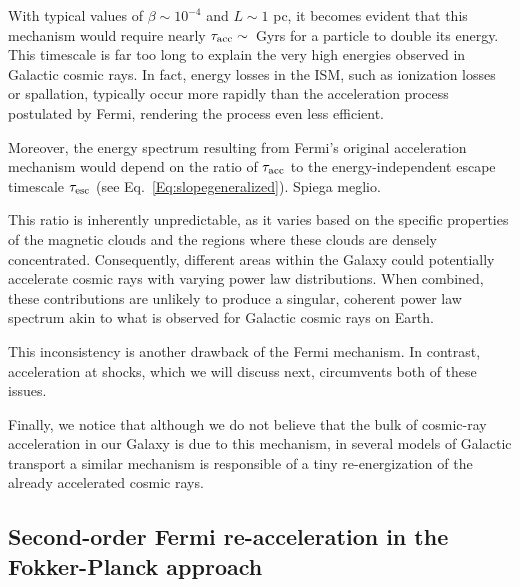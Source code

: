 With typical values of \( \beta \sim 10^{-4} \) and \( L \sim 1 \) pc, it becomes evident that this mechanism would require nearly $\tau_{\rm acc} \sim $~Gyrs for a particle to double its energy. 
%
This timescale is far too long to explain the very high energies observed in Galactic cosmic rays.
In fact, energy losses in the ISM, such as ionization losses or spallation, typically occur more rapidly than the acceleration process postulated by Fermi, rendering the process even less efficient.

Moreover, the energy spectrum resulting from Fermi's original acceleration mechanism would depend on the ratio of $\tau_{\rm acc}$ to the energy-independent escape timescale $\tau_{\rm esc}$ (see Eq.~\ref{Eq:slopegeneralized}). {\color{red}Spiega meglio.}

This ratio is inherently unpredictable, as it varies based on the specific properties of the magnetic clouds and the regions where these clouds are densely concentrated. Consequently, different areas within the Galaxy could potentially accelerate cosmic rays with varying power law distributions. When combined, these contributions are unlikely to produce a singular, coherent power law spectrum akin to what is observed for Galactic cosmic rays on Earth.

This inconsistency is another drawback of the Fermi mechanism. In contrast, acceleration at shocks, which we will discuss next, circumvents both of these issues. 

Finally, we notice that although we do not believe that the bulk of cosmic-ray acceleration in our Galaxy is due to this mechanism, in several models of Galactic transport a similar mechanism is responsible of a tiny re-energization of the already accelerated cosmic rays.



\subsection{Second-order Fermi re-acceleration in the Fokker-Planck approach}

